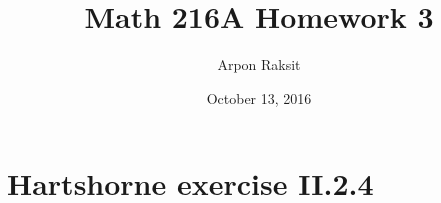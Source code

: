 

\title{Math 216A Homework 3}
\author{Arpon Raksit}
\date{October 13, 2016}




\maketitle

\newcommand{\LocRingSpaces}{\mathrm{LocRingSpaces}}
\newcommand{\Rings}{\mathrm{Rings}}


\section{Hartshorne exercise  II.2.4}

